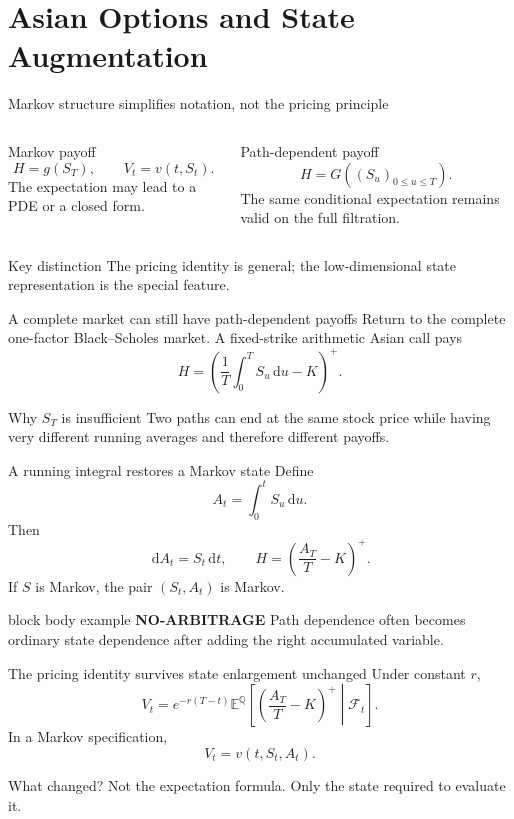 \documentclass[handout,10pt,aspectratio=169]{beamer}
\newenvironment{marketbox}{\begin{beamercolorbox}[rounded=true,sep=0.7em,wd=\textwidth]{block body example}
  \textbf{\color{CourseGreen}NO-ARBITRAGE}\quad}{\end{beamercolorbox}}
\newcommand{\dd}{\,\mathrm d}
\newcommand{\E}{\mathbb E}
\newcommand{\Q}{\mathbb Q}
\newcommand{\cF}{\mathcal F}
\newcommand{\1}{\mathbf 1}
\begin{document}
\section{Asian Options and State Augmentation}

\begin{frame}{Markov structure simplifies notation, not the pricing principle}
\begin{columns}[T,onlytextwidth]
\begin{block}{Markov payoff}
\[
H=g(S_T),\qquad V_t=v(t,S_t).
\]
The expectation may lead to a PDE or a closed form.
\end{block}
\begin{exampleblock}{Path-dependent payoff}
\[
H=G((S_u)_{0\leq u\leq T}).
\]
The same conditional expectation remains valid on the full filtration.
\end{exampleblock}
\end{columns}
\begin{block}{Key distinction}
The pricing identity is general; the low-dimensional state representation is
the special feature.
\end{block}
\end{frame}

\begin{frame}{A complete market can still have path-dependent payoffs}
Return to the complete one-factor Black--Scholes market. A fixed-strike
arithmetic Asian call pays
\[
H=\left(\frac1T\int_0^T S_u\dd u-K\right)^+.
\]
\begin{block}{Why \(S_T\) is insufficient}
Two paths can end at the same stock price while having very different running
averages and therefore different payoffs.
\end{block}
\end{frame}


\begin{frame}{A running integral restores a Markov state}
Define
\[
\boxed{A_t=\int_0^tS_u\dd u.}
\]
Then
\[
\dd A_t=S_t\dd t,
\qquad
H=\left(\frac{A_T}{T}-K\right)^+.
\]
If \(S\) is Markov, the pair \((S_t,A_t)\) is Markov.
\begin{marketbox}
Path dependence often becomes ordinary state dependence after adding the
right accumulated variable.
\end{marketbox}
\end{frame}

\begin{frame}{The pricing identity survives state enlargement unchanged}
Under constant \(r\),
\[
\boxed{
V_t=e^{-r(T-t)}
\E^\Q\!\left[
\left(\frac{A_T}{T}-K\right)^+
\middle|\cF_t\right].}
\]
In a Markov specification,
\[
V_t=v(t,S_t,A_t).
\]
\begin{block}{What changed?}
Not the expectation formula. Only the state required to evaluate it.
\end{block}
\end{frame}
\end{document}
